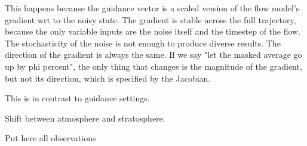 This happens because the guidance vector is a scaled version of the flow model's gradient wrt to the noisy state.
The gradient is stable across the full trajectory, because the only variable inputs are the noise itself and the timestep of the flow.
The stochasticity of the noise is not enough to produce diverse results.
The direction of the gradient is always the same. If we say "let the masked average go up by phi percent", the only thing that changes is the magnitude of the gradient, but not its direction, which is specified by the Jacobian.

This is in contrast to guidance settings.

Shift between atmosphere and stratosphere.

Put here all observations